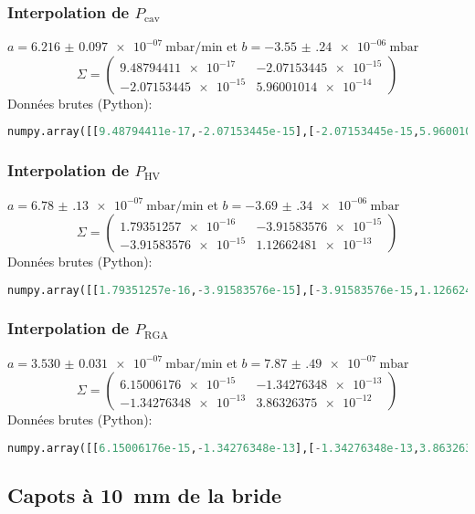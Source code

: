 \subsubsection{Interpolation de $P_\text{cav}$}
$a = \SI{+6.216(97)e-07}{\milli\bar\per\minute}$ et $b = \SI{-3.55(24)e-06}{\milli\bar}$
\[
\Sigma = \left(
\begin{matrix}
\num{9.48794411e-17} & \num{-2.07153445e-15}\\
\num{-2.07153445e-15} & \num{5.96001014e-14}
\end{matrix}\right)
\]
Données brutes (Python):
\begin{lstlisting}[language = Python]
numpy.array([[9.48794411e-17,-2.07153445e-15],[-2.07153445e-15,5.96001014e-14]])
\end{lstlisting}

\subsubsection{Interpolation de $P_\text{HV}$}
$a = \SI{+6.78(13)e-07}{\milli\bar\per\minute}$ et $b = \SI{-3.69(34)e-06}{\milli\bar}$
\[
\Sigma = \left(
\begin{matrix}
\num{1.79351257e-16} & \num{-3.91583576e-15}\\
\num{-3.91583576e-15} & \num{1.12662481e-13}
\end{matrix}\right)
\]
Données brutes (Python):
\begin{lstlisting}[language = Python]
numpy.array([[1.79351257e-16,-3.91583576e-15],[-3.91583576e-15,1.12662481e-13]])
\end{lstlisting}

\subsubsection{Interpolation de $P_\text{RGA}$}
$a = \SI{+3.530(31)e-07}{\milli\bar\per\minute}$ et $b = \SI{+7.87(49)e-07}{\milli\bar}$
\[
\Sigma = \left(
\begin{matrix}
\num{6.15006176e-15} & \num{-1.34276348e-13}\\
\num{-1.34276348e-13} & \num{3.86326375e-12}
\end{matrix}\right)
\]
Données brutes (Python):
\begin{lstlisting}[language = Python]
numpy.array([[6.15006176e-15,-1.34276348e-13],[-1.34276348e-13,3.86326375e-12]])
\end{lstlisting}

\subsection{Capots à \SI{10}{\milli\meter} de la bride}
